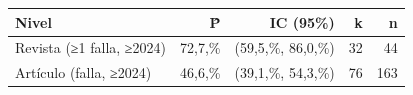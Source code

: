 \begin{tabular}{lrrrr}
\toprule
Nivel & P̂ & IC (95\%) & k & n\\
\midrule
Revista (≥1 falla, ≥2024) & 72,7,\% & (59,5,\%, 86,0,\%) & 32 & 44\\
Artículo (falla, ≥2024) & 46,6,\% & (39,1,\%, 54,3,\%) & 76 & 163\\
\bottomrule
\end{tabular}
